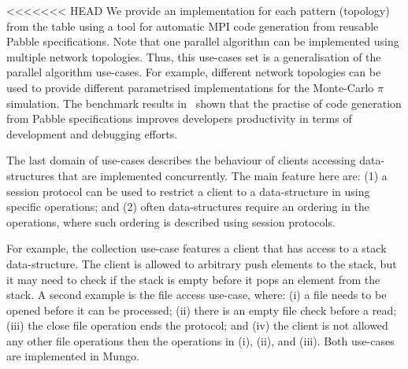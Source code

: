 <<<<<<< HEAD
We provide an implementation for each pattern (topology) from the table using a tool for automatic MPI code generation
from reusable Pabble specifications. Note that one parallel algorithm can be implemented using multiple network topologies.
Thus, this use-cases set is a generalisation of the parallel algorithm use-cases.
For example, different network topologies can be used to provide
different parametrised implementations for the Monte-Carlo $\pi$ simulation.
The benchmark results in~\cite{NCY2015} shown that the practise
of code generation from Pabble specifications improves developers
productivity in terms of development and debugging efforts.


The last domain of use-cases describes the behaviour of
clients accessing data-structures that are implemented
concurrently. The main feature here are:
(1) a session protocol can be used to restrict
a client to a data-structure in using specific operations; and
(2) often data-structures require an ordering in the
operations, where such ordering is described using session protocols.

For example, the collection use-case features a client
that has access to a stack data-structure. The client
is allowed to arbitrary push elements to the stack, but
it may need to check if the stack is empty before it
pops an element from the stack.
A second example is the file access use-case, where:
(i) a file needs to be opened before it can be processed;
(ii) there is an empty file check before a read;
(iii) the close file operation ends the protocol; and
(iv) the client is not allowed any other file operations then
the operations in (i), (ii), and (iii).
Both use-cases are implemented in Mungo.

